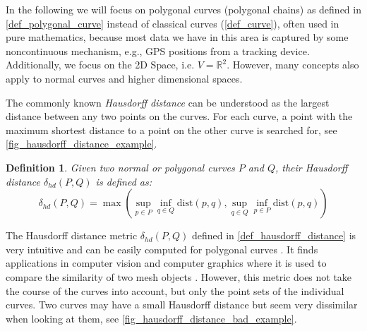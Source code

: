 \documentclass[
oneside,
fontsize=11pt
]{scrartcl}
\newtheorem{mydef}{Definition}
\begin{document}
In the following we will focus on polygonal curves (polygonal chains) 
as defined in \autoref{def_polygonal_curve} 
instead of classical curves (\autoref{def_curve}), often used in pure mathematics, 
because most data we have in this area is 
captured by some noncontinuous mechanism, e.g., GPS positions from a tracking device.
Additionally, we focus on the 2D Space, i.e. $V = \mathbb{R}^2$.
However, many concepts also apply to normal curves and higher dimensional spaces.


The commonly known \textit{Hausdorff distance} can be understood 
as the largest distance between any two points on the curves. 
For each curve, a point with the maximum shortest distance to a point on the other curve is searched for, see \autoref{fig_hausdorff_distance_example}. \cite{alt_computing_1995}


\begin{mydef}
  \label{def_hausdorff_distance}
  Given two normal or polygonal curves $P$ and $Q$, 
  their Hausdorff distance $\delta_{hd}(P,Q)$ is defined as: 
  $$\delta_{hd}(P,Q) = \max \left( \sup_{p \in P} \inf_{q \in Q} \text{dist}(p,q), \sup_{q \in Q} \inf_{p \in P} \text{dist}(p,q) \right)$$
\end{mydef}

The Hausdorff distance metric $\delta_{hd}(P,Q)$ defined in \autoref{def_hausdorff_distance} 
is very intuitive and can be easily computed for polygonal curves \cite{ko_complexity_2013}.
It finds applications in computer vision and computer graphics 
where it is used to compare the similarity of two mesh objects \cite{cignoni_metro_1998,ko_complexity_2013}. 
However, this metric does not take the course of the curves into account, 
but only the point sets of the individual curves.
Two curves may have a small Hausdorff distance but seem very dissimilar 
when looking at them, see \autoref{fig_hausdorff_distance_bad_example}.
\end{document}
